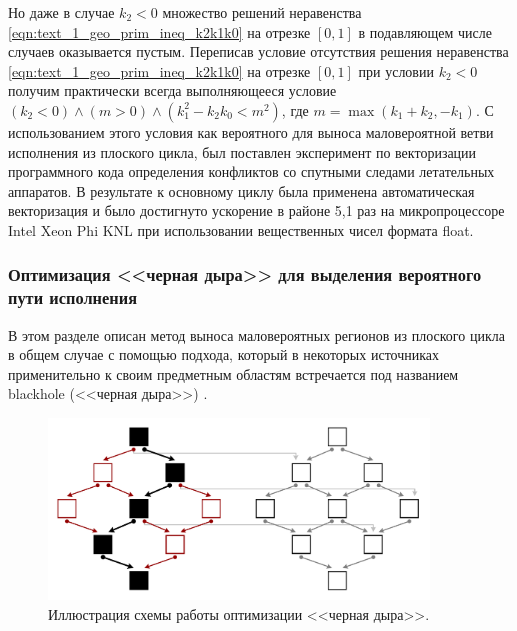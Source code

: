 Но даже в случае $k_2 < 0$ множество решений неравенства \eqref{eqn:text_1_geo_prim_ineq_k2k1k0} на отрезке $[0, 1]$ в подавляющем числе случаев оказывается пустым.
Переписав условие отсутствия решения неравенства \eqref{eqn:text_1_geo_prim_ineq_k2k1k0} на отрезке $[0, 1]$ при условии $k_2 < 0$ получим практически всегда выполняющееся условие $(k_2 < 0) \land (m > 0) \land (k_1^2 - k_2k_0 < m^2)$, где $m = \max(k_1 + k_2, -k_1)$.
С использованием этого условия как вероятного для выноса маловероятной ветви исполнения из плоского цикла, был поставлен эксперимент по векторизации программного кода определения конфликтов со спутными следами летательных аппаратов.
В результате к основному циклу была применена автоматическая векторизация и было достигнуто ускорение в районе 5,1 раз на микропроцессоре Intel Xeon Phi KNL при использовании вещественных чисел формата float.

\subsubsection{Оптимизация <<черная дыра>> для выделения вероятного пути исполнения}

В этом разделе описан метод выноса маловероятных регионов из плоского цикла в общем случае с помощью подхода, который в некоторых источниках применительно к своим предметным областям встречается под названием blackhole (<<черная дыра>>) \cite{Ilbeyi2019}.

\begin{figure}[ht]
\centering
\includegraphics[width=0.9\textwidth]{./fig/vec_blackhole.pdf}
\singlespacing
{}\caption{Иллюстрация схемы работы оптимизации <<черная дыра>>.}
\label{fig:text_4_vec_loc_branch_blackhole}
\end{figure}

